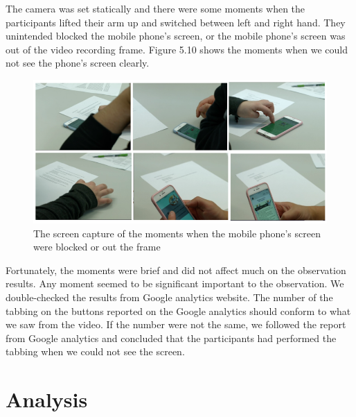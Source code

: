 The camera was set statically and there were some moments when the participants lifted their arm up and switched between left and right hand. They unintended blocked the mobile phone's screen, or the mobile phone's screen was out of the video recording frame. Figure 5.10 shows the moments when we could not see the phone's screen clearly. 

\begin{figure}[!hbt]
\centering
\includegraphics[width=1 \textwidth]{issue}
\caption{The screen capture of the moments when the mobile phone's screen were blocked or out the frame}
\end{figure}

Fortunately, the moments were brief and did not affect much on the observation results. Any moment seemed to be significant important to the observation. We double-checked the results from Google analytics website. The number of the tabbing on the buttons reported on the Google analytics should conform to what we saw from the video. If the number were not the same, we followed the report from Google analytics and concluded that the participants had performed the tabbing when we could not see the screen. 

\newpage
\section{Analysis} 

